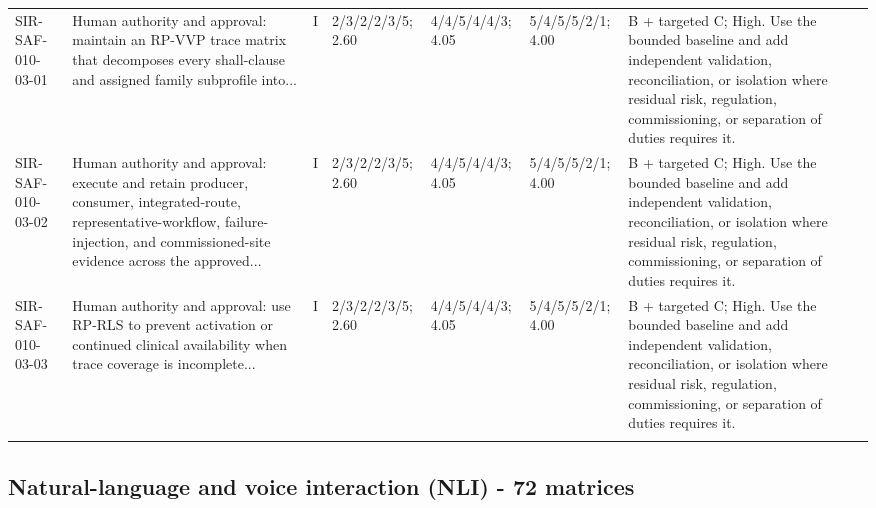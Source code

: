 \documentclass[11pt,letterpaper]{article}
\begin{document}
\begin{scriptsize}
\begin{longtable}{@{}L{0.11\textwidth}L{0.165\textwidth}L{0.04\textwidth}L{0.115\textwidth}L{0.115\textwidth}L{0.115\textwidth}L{0.235\textwidth}@{}}
\addlinespace[2pt]
SIR-SAF-010-03-01 & Human authority and approval: maintain an RP-VVP trace matrix that decomposes every shall-clause and assigned family subprofile into... & I & 2/3/2/2/3/5; 2.60 & 4/4/5/4/4/3; 4.05 & 5/4/5/5/2/1; 4.00 & B + targeted C; High. Use the bounded baseline and add independent validation, reconciliation, or isolation where residual risk, regulation, commissioning, or separation of duties requires it. \\
\addlinespace[2pt]
SIR-SAF-010-03-02 & Human authority and approval: execute and retain producer, consumer, integrated-route, representative-workflow, failure-injection, and commissioned-site evidence across the approved... & I & 2/3/2/2/3/5; 2.60 & 4/4/5/4/4/3; 4.05 & 5/4/5/5/2/1; 4.00 & B + targeted C; High. Use the bounded baseline and add independent validation, reconciliation, or isolation where residual risk, regulation, commissioning, or separation of duties requires it. \\
\addlinespace[2pt]
SIR-SAF-010-03-03 & Human authority and approval: use RP-RLS to prevent activation or continued clinical availability when trace coverage is incomplete... & I & 2/3/2/2/3/5; 2.60 & 4/4/5/4/4/3; 4.05 & 5/4/5/5/2/1; 4.00 & B + targeted C; High. Use the bounded baseline and add independent validation, reconciliation, or isolation where residual risk, regulation, commissioning, or separation of duties requires it. \\
\addlinespace[2pt]
\end{longtable}
\end{scriptsize}

\subsection{Natural-language and voice interaction (NLI) - 72 matrices}
\end{document}
